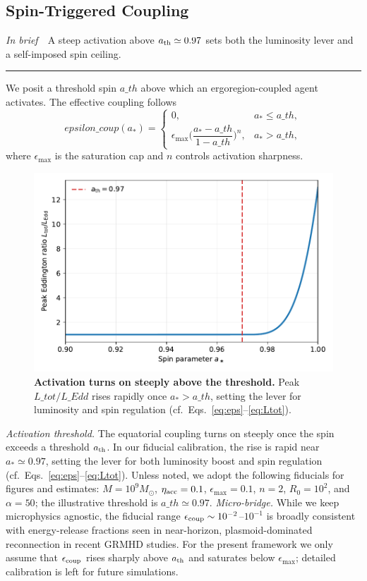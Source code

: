\documentclass[twocolumn]{aastex701}
\newcommand{\ath}{a_{\rm th}}
\newcommand{\rg}{r_g}
\newcommand{\LEdd}{L_{\rm Edd}}
\newcommand{\Ltot}{L_{\rm tot}}
\newcommand{\FeKa}{\mathrm{Fe\,K}\alpha}
\newcommand{\epscoup}{\epsilon_{\rm coup}}
\newcommand{\aeq}{a_{\rm eq}}
\providecommand{\tldr}[1]{%
  \noindent\textit{In brief}\ \textemdash\ #1%
  \par\smallskip
  \noindent\rule{\columnwidth}{0.2pt}\par\medskip
}
\def\ath{a\_th}\def\rg{r\_g}\def\LEdd{L\_Edd}\def\Ltot{L\_tot}\def\FeKa{Fe K\string\alpha}%
\def\epscoup{epsilon\_coup}\def\aeq{a\_eq}\def\mathrm#1{#1}%
\begin{document}
\subsection{Spin-Triggered Coupling}\label{sec:coupling}
\tldr{A steep activation above $a_{\rm th}\simeq0.97$ sets both the luminosity lever and a self-imposed spin ceiling.}
We posit a threshold spin $\ath$ above which an ergoregion-coupled agent activates. The effective coupling follows
\begin{equation}
\epscoup(a_\ast)=
\begin{cases}
0, & a_\ast\le \ath,\\[3pt]
\epsilon_{\max}\Big(\dfrac{a_\ast-\ath}{1-\ath}\Big)^{n}, & a_\ast>\ath,
\end{cases}
\label{eq:eps}
\end{equation}
where $\epsilon_{\max}$ is the saturation cap and $n$ controls activation sharpness.
\begin{figure}[!htbp]
  \centering
  \includegraphics[width=.92\linewidth]{Fig_Onset.pdf}
\caption{\textbf{Activation turns on steeply above the threshold.}
Peak $\Ltot/\LEdd$ rises rapidly once $a_\ast\!>\!\ath$, setting the lever for luminosity and spin regulation (cf.\ Eqs.~\eqref{eq:eps}--\eqref{eq:Ltot}).}
  \label{fig:onset}
\end{figure}
\noindent\textit{Activation threshold.}
The equatorial coupling turns on steeply once the spin exceeds a threshold \(a_{\rm th}\).
In our fiducial calibration, the rise is rapid near \(a_\ast \simeq 0.97\), setting the lever for both luminosity boost and spin regulation (cf.\ Eqs.~\eqref{eq:eps}--\eqref{eq:Ltot}).
\FloatBarrier
Unless noted, we adopt the following fiducials for figures and estimates: $M=10^9M_\odot$, $\eta_{\rm acc}=0.1$, $\epsilon_{\max}=0.1$, $n=2$, $R_0=10^2$, and $\alpha=50$; the illustrative threshold is $\ath\simeq0.97$.
\noindent\emph{Micro-bridge.}
While we keep microphysics agnostic, the fiducial range
$\epsilon_{\rm coup}\sim10^{-2}$--$10^{-1}$ is broadly consistent with
energy-release fractions seen in near-horizon, plasmoid-dominated
reconnection in recent GRMHD studies. For the present framework we only
assume that $\epsilon_{\rm coup}$ rises sharply above $a_{\rm th}$ and
saturates below $\epsilon_{\max}$; detailed calibration is left for
future simulations.
\end{document}
